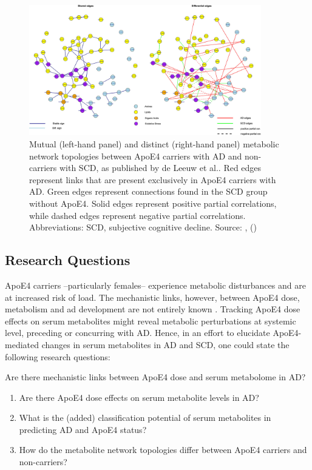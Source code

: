 \documentclass{amsart}
\begin{document}
\begin{figure}[htb]
\vspace*{-0.2cm}
  \includegraphics[width=0.9\textwidth]{figures/network.jpeg}
    \caption{Mutual (left-hand panel) and distinct (right-hand panel) metabolic network topologies between ApoE4 carriers with AD and non-carriers with SCD, as published by de Leeuw et al.. Red edges represent links that are present exclusively in ApoE4 carriers with AD. Green edges represent connections found in the SCD group without ApoE4. Solid edges represent positive partial correlations, while dashed edges represent negative partial correlations. Abbreviations: SCD, subjective cognitive decline. Source: , \citeauthor{deLeeuw2017Blood-basedDisease} (\citeyear{deLeeuw2017Blood-basedDisease}) \cite{deLeeuw2017Blood-basedDisease}}
  \label{netan17}
\end{figure}

\newpage
\subsection{Research Questions}
ApoE4 carriers --particularly females-- experience metabolic disturbances and are at increased risk of \acrshort{load}. The mechanistic links, however, between ApoE4 dose, metabolism and \acrshort{ad} development are not entirely known \cite{Fernandez-Calle2022APOEDiseases}. Tracking ApoE4 dose effects on serum metabolites might reveal metabolic perturbations at systemic level, preceding or concurring with AD. Hence, in an effort to elucidate ApoE4-mediated changes in serum metabolites in AD and SCD, one could state the following research questions:

Are there mechanistic links between ApoE4 dose and serum metabolome in AD?
\begin{enumerate}
    \item Are there ApoE4 dose effects on serum metabolite levels in AD?
    \item What is the (added) classification potential of serum metabolites in predicting AD and ApoE4 status?   
    \item How do the metabolite network topologies differ between ApoE4 carriers and non-carriers?
\end{enumerate}
\end{document}
